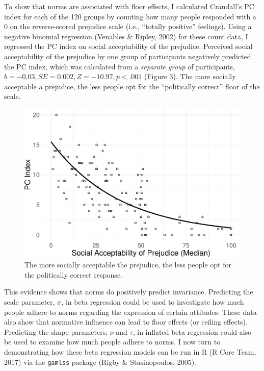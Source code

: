 \documentclass[english,man]{apa6}
\theoremstyle{definition}
\theoremstyle{definition}
\theoremstyle{remark}
\begin{document}
To show that norms are associated with floor effects, I calculated
Crandall's PC index for each of the 120 groups by counting how many
people responded with a 0 on the reverse-scored prejudice scale (i.e.,
\enquote{totally positive} feelings). Using a negative binomial
regression (Venables \& Ripley, 2002) for these count data, I regressed
the PC index on social acceptability of the prejudice. Perceived social
acceptability of the prejudice by one group of participants negatively
predicted the PC index, which was calculated from a \emph{separate
group} of participants, \(b = -0.03, SE = 0.002, Z = -10.97, p < .001\)
(Figure 3). The more socially acceptable a prejudice, the less people
opt for the \enquote{politically correct} floor of the scale.

\begin{figure}
\centering
\includegraphics{beta_hurdle_files/figure-latex/unnamed-chunk-4-1.pdf}
\caption{\label{fig:unnamed-chunk-4}The more socially acceptable the
prejudice, the less people opt for the politically correct response.}
\end{figure}

This evidence shows that norms do positively predict invariance.
Predicting the scale parameter, \(\sigma\), in beta regression could be
used to investigate how much people adhere to norms regarding the
expression of certain attitudes. These data also show that normative
influence can lead to floor effects (or ceiling effects). Predicting the
shape parameters, \(\nu\) and \(\tau\), in inflated beta regression
could also be used to examine how much people adhere to norms. I now
turn to demonstrating how these beta regression models can be run in R
(R Core Team, 2017) via the \texttt{gamlss} package (Rigby \&
Stasinopoulos, 2005).
\end{document}
